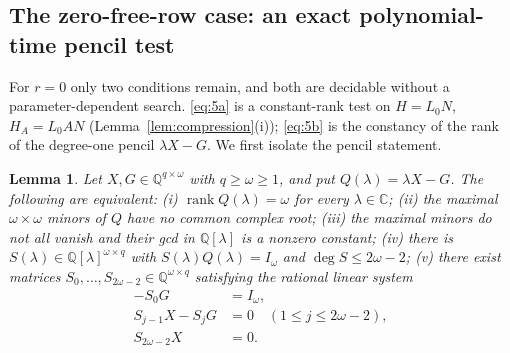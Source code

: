 \documentclass[journal]{IEEEtran}
\theoremstyle{plainn}
\newtheorem{lem}[thm]{Lemma}
\theoremstyle{remark}
\begin{document}
\subsection{The zero-free-row case: an exact polynomial-time pencil test}\label{sec:zero}

For $r=0$ only two conditions remain, and both are decidable without a
parameter-dependent search. \eqref{eq:5a} is a constant-rank test on
$H=L_0N$, $H_A=L_0AN$ (Lemma~\ref{lem:compression}(i)); \eqref{eq:5b} is the
constancy of the rank of the degree-one pencil $\lambda X-G$. We first isolate
the pencil statement.

\begin{lem}\label{lem:zero}
Let $X,G\in\mathbb Q^{q\times\omega}$ with $q\ge\omega\ge1$, and put
$Q(\lambda)=\lambda X-G$. The following are equivalent:
\emph{(i)} $\operatorname{rank}Q(\lambda)=\omega$ for every
$\lambda\in\mathbb C$;
\emph{(ii)} the maximal $\omega\times\omega$ minors of $Q$ have no common
complex root;
\emph{(iii)} the maximal minors do not all vanish and their gcd in
$\mathbb Q[\lambda]$ is a nonzero constant;
\emph{(iv)} there is $S(\lambda)\in\mathbb Q[\lambda]^{\omega\times q}$ with
$S(\lambda)Q(\lambda)=I_\omega$ and $\deg S\le2\omega-2$;
\emph{(v)} there exist matrices
$S_0,\dots,S_{2\omega-2}\in\mathbb Q^{\omega\times q}$ satisfying the rational
linear system
\begin{equation}
\tag{R0}\label{eq:R0}
\begin{aligned}
-S_0G&=I_\omega,\\
S_{j-1}X-S_jG&=0\quad(1\le j\le2\omega-2),\\
S_{2\omega-2}X&=0 .
\end{aligned}
\end{equation}
\end{lem}
\end{document}
